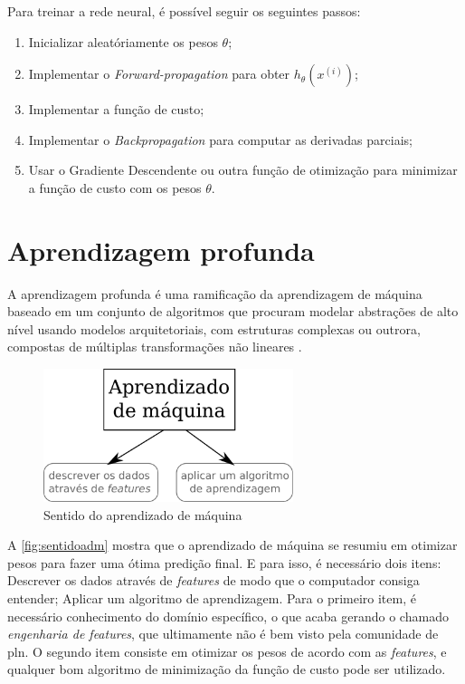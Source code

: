 Para treinar a rede neural, é possível seguir os seguintes passos:

\begin{enumerate}

\item Inicializar aleatóriamente os pesos $\theta$;
\item Implementar o \textit{Forward-propagation} para obter $h_\theta(x^{(i)})$;
\item Implementar a função de custo;
\item Implementar o \textit{Backpropagation} para computar as derivadas parciais;
\item Usar o Gradiente Descendente ou outra função de otimização para minimizar a função de custo com os pesos $\theta$.

\end{enumerate}


\section{Aprendizagem profunda}

A aprendizagem profunda é uma ramificação da aprendizagem de máquina baseado em um conjunto de algoritmos que procuram modelar abstrações de alto nível usando modelos arquitetoriais, com estruturas complexas ou outrora, compostas de múltiplas transformações não lineares \cite{deng2014deep}.

\begin{figure}
\centering
\caption{Sentido do aprendizado de máquina} \label{fig:sentidoadm}
\includegraphics[width=0.65\textwidth]{img/sentidoadm}
\end{figure}

A \autoref{fig:sentidoadm} mostra que o aprendizado de máquina se resumiu em otimizar pesos para fazer uma ótima predição final. E para isso, é necessário dois itens: Descrever os dados através de \textit{features} de modo que o computador consiga entender; Aplicar um algoritmo de aprendizagem. Para o primeiro item, é necessário conhecimento do domínio específico, o que acaba gerando o chamado \textit{engenharia de features}, que ultimamente não é bem visto pela comunidade de \ac{pln}. O segundo item consiste em otimizar os pesos de acordo com as \textit{features}, e qualquer bom algoritmo de minimização da função de custo pode ser utilizado.

